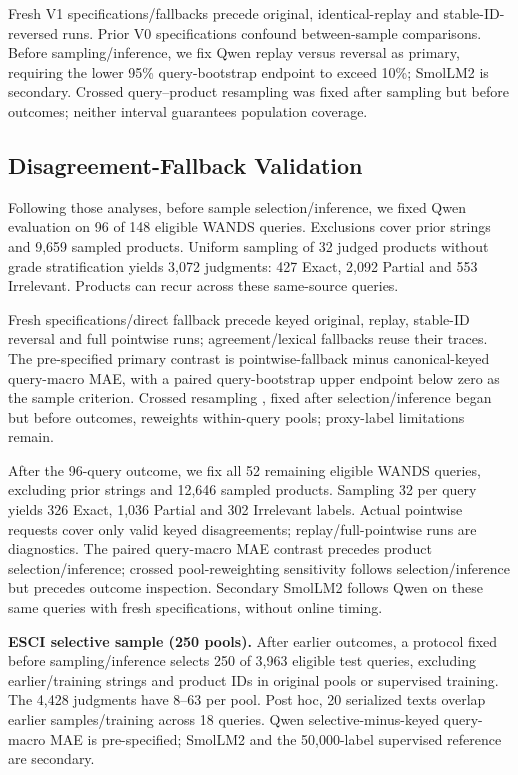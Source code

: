 \documentclass[conference]{IEEEtran}
\begin{document}
Fresh V1 specifications/fallbacks precede original, identical-replay and stable-ID-reversed runs. Prior V0 specifications confound between-sample comparisons. Before sampling/inference, we fix Qwen replay versus reversal as primary, requiring the lower 95\% query-bootstrap endpoint to exceed 10\%; SmolLM2 is secondary. Crossed query--product resampling \cite{pigeonhole} was fixed after sampling but before outcomes; neither interval guarantees population coverage.

\subsection{Disagreement-Fallback Validation}
Following those analyses, before sample selection/inference, we fixed Qwen evaluation on 96 of 148 eligible WANDS queries. Exclusions cover prior strings and 9,659 sampled products. Uniform sampling of 32 judged products without grade stratification yields 3,072 judgments: 427 Exact, 2,092 Partial and 553 Irrelevant. Products can recur across these same-source queries.

Fresh specifications/direct fallback precede keyed original, replay, stable-ID reversal and full pointwise runs; agreement/lexical fallbacks reuse their traces. The pre-specified primary contrast is pointwise-fallback minus canonical-keyed query-macro MAE, with a paired query-bootstrap upper endpoint below zero as the sample criterion. Crossed resampling \cite{pigeonhole}, fixed after selection/inference began but before outcomes, reweights within-query pools; proxy-label limitations remain.

After the 96-query outcome, we fix all 52 remaining eligible WANDS queries, excluding prior strings and 12,646 sampled products. Sampling 32 per query yields 326 Exact, 1,036 Partial and 302 Irrelevant labels. Actual pointwise requests cover only valid keyed disagreements; replay/full-pointwise runs are diagnostics. The paired query-macro MAE contrast precedes product selection/inference; crossed pool-reweighting sensitivity follows selection/inference but precedes outcome inspection. Secondary SmolLM2 follows Qwen on these same queries with fresh specifications, without online timing.

\textbf{ESCI selective sample (250 pools).} After earlier outcomes, a protocol fixed before sampling/inference selects 250 of 3,963 eligible test queries, excluding earlier/training strings and product IDs in original pools or supervised training. The 4,428 judgments have 8--63 per pool. Post hoc, 20 serialized texts overlap earlier samples/training across 18 queries. Qwen selective-minus-keyed query-macro MAE is pre-specified; SmolLM2 and the 50,000-label supervised reference are secondary.
\end{document}
